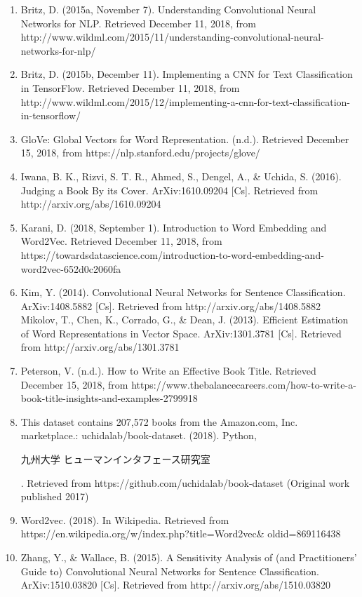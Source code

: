\documentclass[jou,apacite, 10px]{apa6}
\begin{document}
\begin{enumerate}[(1)]
\item Britz, D. (2015a, November 7). Understanding Convolutional Neural Networks for NLP. Retrieved December 11, 2018, from http://www.wildml.com/2015/11/understanding-convolutional-neural-networks-for-nlp/
\item Britz, D. (2015b, December 11). Implementing a CNN for Text Classification in TensorFlow. Retrieved December 11, 2018, from http://www.wildml.com/2015/12/implementing-a-cnn-for-text-classification-in-tensorflow/
\item GloVe: Global Vectors for Word Representation. (n.d.). Retrieved December 15, 2018, from https://nlp.stanford.edu/projects/glove/
\item Iwana, B. K., Rizvi, S. T. R., Ahmed, S., Dengel, A., \& Uchida, S. (2016). Judging a Book By its Cover. ArXiv:1610.09204 [Cs]. Retrieved from http://arxiv.org/abs/1610.09204
\item Karani, D. (2018, September 1). Introduction to Word Embedding and Word2Vec. Retrieved December 11, 2018, from https://towardsdatascience.com/introduction-to-word-embedding-and-word2vec-652d0c2060fa
\item Kim, Y. (2014). Convolutional Neural Networks for Sentence Classification. ArXiv:1408.5882 [Cs]. Retrieved from http://arxiv.org/abs/1408.5882
Mikolov, T., Chen, K., Corrado, G., \& Dean, J. (2013). Efficient Estimation of Word Representations in Vector Space. ArXiv:1301.3781 [Cs]. Retrieved from http://arxiv.org/abs/1301.3781
\item Peterson, V. (n.d.). How to Write an Effective Book Title. Retrieved December 15, 2018, from https://www.thebalancecareers.com/how-to-write-a-book-title-insights-and-examples-2799918
\item This dataset contains 207,572 books from the Amazon.com, Inc. marketplace.: uchidalab/book-dataset. (2018). Python, \begin{CJK}{UTF8}{min}九州大学 ヒューマンインタフェース研究室\end{CJK}. Retrieved from https://github.com/uchidalab/book-dataset (Original work published 2017)
\item Word2vec. (2018). In Wikipedia. Retrieved from https://en.wikipedia.org/w/index.php?title=Word2vec\& oldid=869116438
\item Zhang, Y., \& Wallace, B. (2015). A Sensitivity Analysis of (and Practitioners’ Guide to) Convolutional Neural Networks for Sentence Classification. ArXiv:1510.03820 [Cs]. Retrieved from http://arxiv.org/abs/1510.03820
\end{enumerate}
\end{document}
